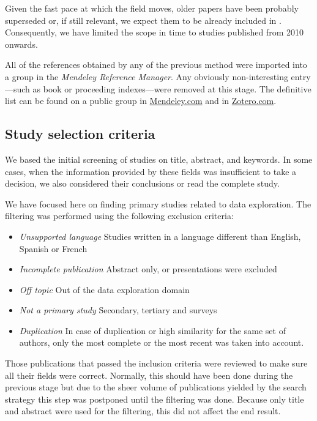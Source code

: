 Given the fast pace at which the field moves, older papers have been probably
superseded or, if still relevant, we expect them to be already included in \cite{Idreos2015}.
Consequently, we have limited the scope in time to studies published from 2010 onwards.

All of the references obtained by any of the previous method were imported into
a group in the \emph{Mendeley Reference Manager}. Any obviously non-interesting entry
---such as book or proceeding indexes---were removed at this stage.
The definitive list can be found on a public group in
\href{https://www.mendeley.com/community/interactive-data-exploration-in-science-systematic-mapping/}{Mendeley.com} and in
\href{https://www.zotero.org/groups/4517638/interactive-data-exploration-in-science-systematic-mapping/library}{Zotero.com}\footnotemark.


\subsection{Study selection criteria}
We based the initial screening of studies on title, abstract, and keywords.
In some cases, when the information provided by these fields was
insufficient to take a decision, we also considered their conclusions
or read the complete study.

We have focused here on finding primary studies related to data exploration.
The filtering was performed using the following exclusion criteria:

\begin{itemize}
  \item \emph{Unsupported language} Studies written in a language different than
  English, Spanish or French
  \item \emph{Incomplete publication} Abstract only, or presentations were excluded
  \item \emph{Off topic} Out of the data exploration domain
  \item \emph{Not a primary study} Secondary, tertiary and surveys
  \item \emph{Duplication} In case of duplication or high similarity for the same
  set of authors, only the most complete or the most recent was
  taken into account.
\end{itemize}

Those publications that passed the inclusion criteria were reviewed to make
sure all their fields were correct. Normally, this should have been done during
the previous stage but due to the sheer volume of publications yielded by the
search strategy this step was postponed until the filtering was done. Because only
title and abstract were used for the filtering, this did not affect the end
result.

